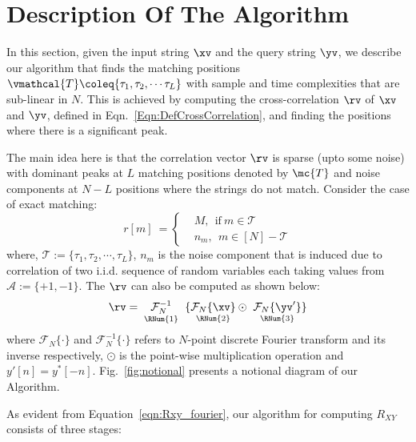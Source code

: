 \section{Description Of The Algorithm}
\label{sec:Algo_desc}
In this section, given the input string $\xv$ and the query string $\yv$, we describe our algorithm that finds the matching positions $\vmathcal{T}\coleq \{\tau_1, \tau_2, \cdots \tau_L\}$ with sample and time complexities that are sub-linear in $N$. This is achieved by computing the cross-correlation $\rv$ of $\xv$ and $\yv$, defined in Eqn.~\eqref{Eqn:DefCrossCorrelation}, and finding the positions where there is a significant peak. 

The main idea here is that the correlation vector $\rv$ is sparse (upto some noise) with dominant peaks at $L$ matching positions denoted by $\mc{T}$ and noise components at $N-L$ positions where the strings do not match. Consider the case of exact matching:
\begin{equation} \label{eqn:RXY_sparse}
r[m] \ = \left\{
\begin{array}{ll}
  &M,~~  \text{if} \ m \in \mathcal{T} \\
  & n_m,~~ m \in [N]-\mathcal{T}
\end{array} 
\right.  
\end{equation}
where, $ \mathcal{T}:=\{\tau_1, \tau_2, \cdots, \tau_L\}$,
 $n_m$ is the noise component that is induced due to correlation of two i.i.d. sequence of random variables each taking values from $\mathcal{A} := \{+1,-1\}$. The $\rv$ can also be computed as shown below:
\begin{equation}\label{eqn:Rxy_fourier}
  \rv = \underset{\text{ \RNum{1} } } {\mathcal{F}_{N}^{-1}} \ \{ \underset{\text{ \RNum{2} } }{  \mathcal{F}_{N}\{\xv\}}  \odot \ \underset{\text{ \RNum{3} } }{ \mathcal{F}_{N}\{\yv'\}}  \} 
\end{equation} 
where $\mathcal{F}_{N}\{ \cdot \}$ and $\mathcal{F}_{N}^{-1}\{ \cdot \}$ refers to $N$-point discrete Fourier transform and its inverse respectively, $\odot$ is the point-wise multiplication operation and ${ y'[n]} = { y^{*}[-n]}$. Fig.~\ref{fig:notional} presents a notional diagram of our Algorithm.

 As evident from Equation~\ref{eqn:Rxy_fourier}, our algorithm for computing $R_{XY}$ consists of three stages:

